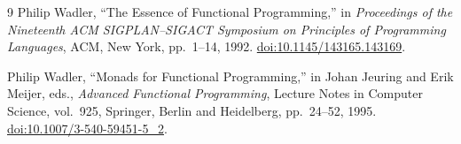 \documentclass[11pt]{article}
\begin{document}
\begin{thebibliography}{9}
Philip Wadler,
``The Essence of Functional Programming,''
in \emph{Proceedings of the Nineteenth ACM
SIGPLAN--SIGACT Symposium on Principles of Programming Languages},
ACM, New York,
pp.~1--14, 1992.
\href{https://doi.org/10.1145/143165.143169}
{doi:10.1145/143165.143169}.

Philip Wadler,
``Monads for Functional Programming,''
in Johan Jeuring and Erik Meijer, eds.,
\emph{Advanced Functional Programming},
Lecture Notes in Computer Science, vol.~925,
Springer, Berlin and Heidelberg,
pp.~24--52, 1995.
\href{https://doi.org/10.1007/3-540-59451-5_2}
{doi:10.1007/3-540-59451-5\_2}.

\end{thebibliography}
\end{document}

